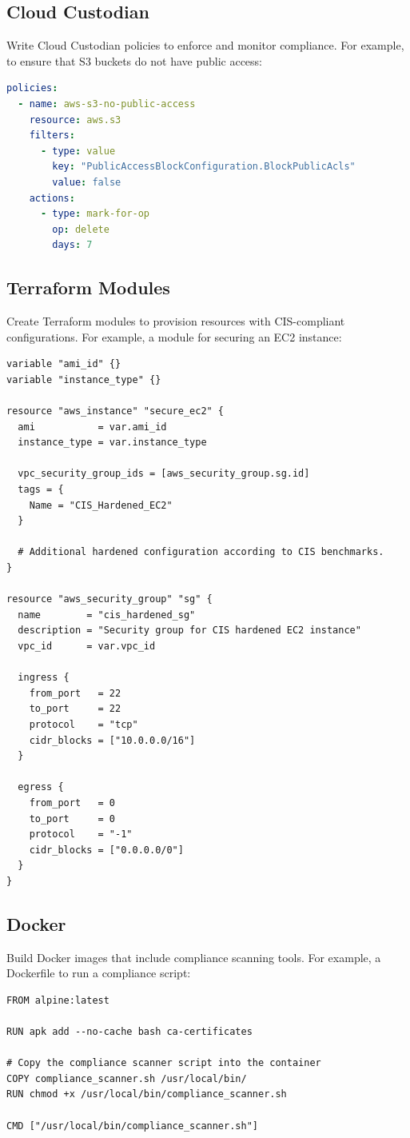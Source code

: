 \documentclass[12pt]{article}
\begin{document}
\subsection{Cloud Custodian}
Write Cloud Custodian policies to enforce and monitor compliance. For example, to ensure that S3 buckets do not have public access:
\begin{lstlisting}[language=YAML, caption={Cloud Custodian Policy for S3 Compliance}]
policies:
  - name: aws-s3-no-public-access
    resource: aws.s3
    filters:
      - type: value
        key: "PublicAccessBlockConfiguration.BlockPublicAcls"
        value: false
    actions:
      - type: mark-for-op
        op: delete
        days: 7
\end{lstlisting}

\subsection{Terraform Modules}
Create Terraform modules to provision resources with CIS-compliant configurations. For example, a module for securing an EC2 instance:
\begin{lstlisting}[language=HCL, caption={Terraform Module Example for a Hardened EC2 Instance}]
variable "ami_id" {}
variable "instance_type" {}

resource "aws_instance" "secure_ec2" {
  ami           = var.ami_id
  instance_type = var.instance_type

  vpc_security_group_ids = [aws_security_group.sg.id]
  tags = {
    Name = "CIS_Hardened_EC2"
  }

  # Additional hardened configuration according to CIS benchmarks.
}

resource "aws_security_group" "sg" {
  name        = "cis_hardened_sg"
  description = "Security group for CIS hardened EC2 instance"
  vpc_id      = var.vpc_id

  ingress {
    from_port   = 22
    to_port     = 22
    protocol    = "tcp"
    cidr_blocks = ["10.0.0.0/16"]
  }

  egress {
    from_port   = 0
    to_port     = 0
    protocol    = "-1"
    cidr_blocks = ["0.0.0.0/0"]
  }
}
\end{lstlisting}

\subsection{Docker}
Build Docker images that include compliance scanning tools. For example, a Dockerfile to run a compliance script:
\begin{lstlisting}[language=Docker, caption={Dockerfile for Compliance Scanner}]
FROM alpine:latest

RUN apk add --no-cache bash ca-certificates

# Copy the compliance scanner script into the container
COPY compliance_scanner.sh /usr/local/bin/
RUN chmod +x /usr/local/bin/compliance_scanner.sh

CMD ["/usr/local/bin/compliance_scanner.sh"]
\end{lstlisting}
\end{document}
